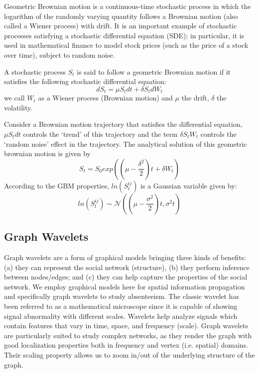 Geometric Brownian motion is a continuous-time stochastic process in which the logarithm of the randomly varying quantity follows a Brownian motion (also called a Wiener process) with drift. It is an important example of stochastic processes satisfying a stochastic differential equation (SDE); in particular, it is used in mathematical finance to model stock prices (such as the price of a stock over time), subject to random noise.

A stochastic process $S_t$ is said to follow a geometric Brownian motion if it satisfies the following stochastic differential equation:
$$d S_t = \mu S_t dt + \delta S_t dW_t $$
we call $W_t$ as a Wiener process (Brownian motion) and $\mu$ the drift, $\delta$ the volatility.

Consider a Brownian motion trajectory that satisfies the differential equation, $\mu S_t dt$ controls the `trend' of this trajectory and the term $\delta S_t W_t$ controls the `random noise' effect in the trajectory. The analytical solution of this geometric brownian motion is given by $$S_t = S_0 exp((\mu-\frac{\delta^2}{2})t + \delta W_t) $$
According to the GBM properties, $ln(S_{t}^{ij})$ is a Gaussian variable given by:
$$ln(S_{t}^{ij})\sim \mathcal{N}((\mu - \frac{\sigma^2}{2})t, \sigma ^{2}t)$$


\subsection{Graph Wavelets}
Graph wavelets are a form of graphical models bringing
three kinds of benefits: (a) they can
represent the social network (structure), (b) they
perform inference between nodes/edges; and (c) they can help
capture the properties of the social network. We employ graphical models here for spatial
information propagation and specifically graph wavelets to study absenteeism.
The classic wavelet has been referred
to as a mathematical microscope since it is capable of showing signal abnormality with
different scales. Wavelets help analyze signals which contain features that vary in time, space, and frequency (scale). Graph wavelets are particularly suited to study
complex networks, as they
render the graph with good localization properties both in frequency and vertex (i.e. spatial)
domains. Their scaling property allows us to zoom in/out of the underlying structure of the graph.

